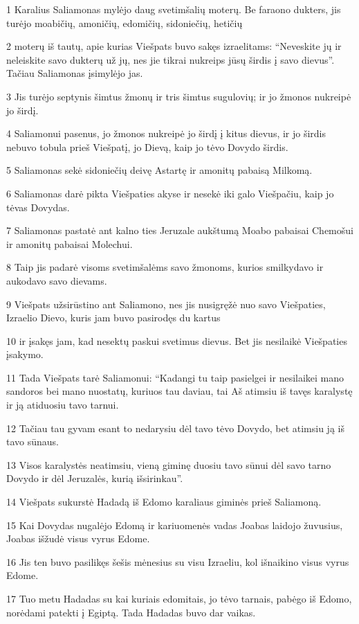 \par 1 Karalius Saliamonas mylėjo daug svetimšalių moterų. Be faraono dukters, jis turėjo moabičių, amoničių, edomičių, sidoniečių, hetičių­ 
\par 2 moterų iš tautų, apie kurias Viešpats buvo sakęs izraelitams: “Neveskite jų ir neleiskite savo dukterų už jų, nes jie tikrai nukreips jūsų širdis į savo dievus”. Tačiau Saliamonas įsimylėjo jas. 
\par 3 Jis turėjo septynis šimtus žmonų ir tris šimtus sugulovių; ir jo žmonos nukreipė jo širdį. 
\par 4 Saliamonui pasenus, jo žmonos nukreipė jo širdį į kitus dievus, ir jo širdis nebuvo tobula prieš Viešpatį, jo Dievą, kaip jo tėvo Dovydo širdis. 
\par 5 Saliamonas sekė sidoniečių deivę Astartę ir amonitų pabaisą Milkomą. 
\par 6 Saliamonas darė pikta Viešpaties akyse ir nesekė iki galo Viešpačiu, kaip jo tėvas Dovydas. 
\par 7 Saliamonas pastatė ant kalno ties Jeruzale aukštumą Moabo pabaisai Chemošui ir amonitų pabaisai Molechui. 
\par 8 Taip jis padarė visoms svetimšalėms savo žmonoms, kurios smilkydavo ir aukodavo savo dievams. 
\par 9 Viešpats užsirūstino ant Saliamono, nes jis nusigręžė nuo savo Viešpaties, Izraelio Dievo, kuris jam buvo pasirodęs du kartus 
\par 10 ir įsakęs jam, kad nesektų paskui svetimus dievus. Bet jis nesilaikė Viešpaties įsakymo. 
\par 11 Tada Viešpats tarė Saliamonui: “Kadangi tu taip pasielgei ir nesilaikei mano sandoros bei mano nuostatų, kuriuos tau daviau, tai Aš atimsiu iš tavęs karalystę ir ją atiduosiu tavo tarnui. 
\par 12 Tačiau tau gyvam esant to nedarysiu dėl tavo tėvo Dovydo, bet atimsiu ją iš tavo sūnaus. 
\par 13 Visos karalystės neatimsiu, vieną giminę duosiu tavo sūnui dėl savo tarno Dovydo ir dėl Jeruzalės, kurią išsirinkau”. 
\par 14 Viešpats sukurstė Hadadą iš Edomo karaliaus giminės prieš Saliamoną. 
\par 15 Kai Dovydas nugalėjo Edomą ir kariuomenės vadas Joabas laidojo žuvusius, Joabas išžudė visus vyrus Edome. 
\par 16 Jis ten buvo pasilikęs šešis mėnesius su visu Izraeliu, kol išnaikino visus vyrus Edome. 
\par 17 Tuo metu Hadadas su kai kuriais edomitais, jo tėvo tarnais, pabėgo iš Edomo, norėdami patekti į Egiptą. Tada Hadadas buvo dar vaikas. 
